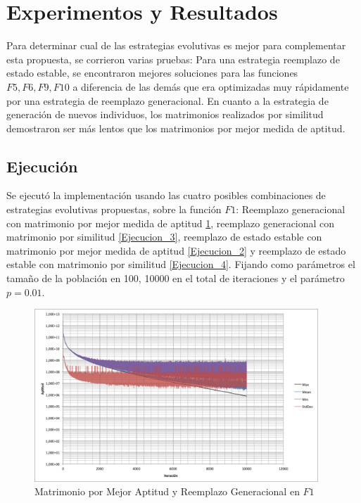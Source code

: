 \documentclass{llncs}
\begin{document}
\section{Experimentos y Resultados}
Para determinar cual de las estrategias evolutivas es mejor para complementar esta propuesta, se corrieron varias pruebas: 
Para una estrategia reemplazo de estado estable, se encontraron mejores soluciones para las funciones ${F5,F6,F9,F10}$ a diferencia de las demás que era optimizadas muy rápidamente por una estrategia de reemplazo generacional. 
En cuanto a la estrategia de generación de nuevos individuos, los matrimonios realizados por similitud demostraron ser más lentos que los matrimonios por mejor medida de aptitud.

\subsection{Ejecución}
Se ejecutó la implementación usando las cuatro posibles combinaciones de estrategias evolutivas propuestas, sobre la función $F1$:
Reemplazo generacional con matrimonio por mejor medida de aptitud \ref{Ejecucion_1}, reemplazo generacional con matrimonio por similitud \ref{Ejecucion_3}, reemplazo de estado estable con matrimonio por mejor medida de aptitud \ref{Ejecucion_2} y reemplazo de estado estable con matrimonio por similitud \ref{Ejecucion_4}. Fijando como parámetros el tamaño de la población en 100, 10000 en el total de iteraciones y el parámetro $p=0.01$.

\begin{figure}
  \centering
    \includegraphics[width=0.95\textwidth]{bestFitGen}
  \caption{Matrimonio por Mejor Aptitud  y Reemplazo Generacional en $F1$}
  \label{Ejecucion_1}
\end{figure}
\end{document}
